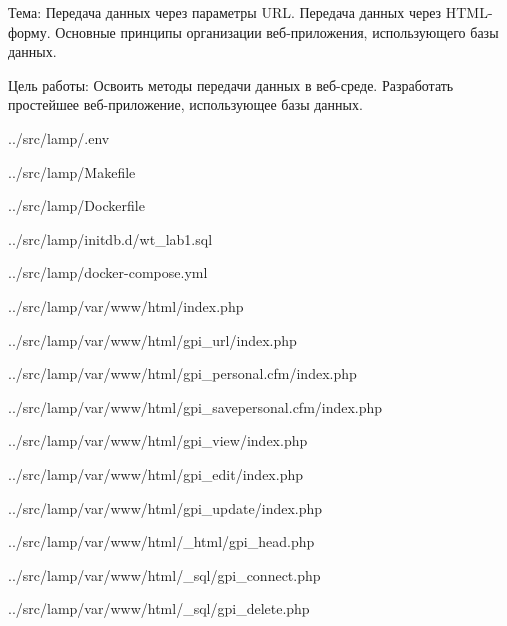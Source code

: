 Тема:
Передача данных через параметры URL.
Передача данных через HTML-форму.
Основные принципы организации веб-приложения, использующего базы данных.

Цель работы:
Освоить методы передачи данных в веб-среде.
Разработать простейшее веб-приложение, использующее базы данных.


{../src/lamp/.env}


{../src/lamp/Makefile}


{../src/lamp/Dockerfile}


{../src/lamp/initdb.d/wt_lab1.sql}

\newpage


{../src/lamp/docker-compose.yml}


{../src/lamp/var/www/html/index.php}

\newpage


{../src/lamp/var/www/html/gpi_url/index.php}


{../src/lamp/var/www/html/gpi_personal.cfm/index.php}


{../src/lamp/var/www/html/gpi_savepersonal.cfm/index.php}


{../src/lamp/var/www/html/gpi_view/index.php}


{../src/lamp/var/www/html/gpi_edit/index.php}


{../src/lamp/var/www/html/gpi_update/index.php}


{../src/lamp/var/www/html/_html/gpi_head.php}


{../src/lamp/var/www/html/_sql/gpi_connect.php}


{../src/lamp/var/www/html/_sql/gpi_delete.php}
